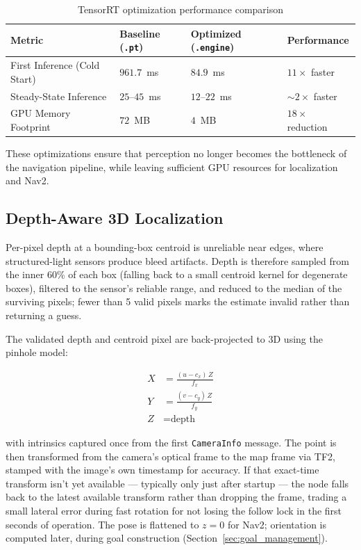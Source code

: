 \begin{table}[htbp]
\centering
\caption{TensorRT optimization performance comparison}
\label{tab:tensorrt_metrics}
\begin{tabular}{llll}
\toprule
\textbf{Metric} & \textbf{Baseline (\texttt{.pt})} & \textbf{Optimized (\texttt{.engine})} & \textbf{Performance} \\
\midrule
First Inference (Cold Start) & $961.7$~ms & $84.9$~ms & $11\times$ faster \\
Steady-State Inference      & $25$--$45$~ms & $12$--$22$~ms & $\sim 2\times$ faster \\
GPU Memory Footprint         & $72$~MB   & $4$~MB    & $18\times$ reduction \\
\bottomrule
\end{tabular}
\end{table}

These optimizations ensure that perception no longer becomes the bottleneck of the navigation pipeline, while leaving sufficient GPU resources for localization and Nav2.
 
\subsection{Depth-Aware 3D Localization}
\label{sec:localization}
 
Per-pixel depth at a bounding-box centroid is unreliable near edges, where structured-light sensors produce bleed artifacts. Depth is therefore sampled from the inner 60\% of each box (falling back to a small centroid kernel for degenerate boxes), filtered to the sensor's reliable range, and reduced to the median of the surviving pixels; fewer than 5 valid pixels marks the estimate invalid rather than returning a guess.
 
The validated depth and centroid pixel are back-projected to 3D using the pinhole model:
 
\begin{align}
X &= \frac{(u - c_x)\,Z}{f_x} \\
Y &= \frac{(v - c_y)\,Z}{f_y} \\
Z &= \text{depth}
\end{align}
 
with intrinsics captured once from the first \texttt{CameraInfo} message. The point is then transformed from the camera's optical frame to the map frame via TF2, stamped with the image's own timestamp for accuracy. If that exact-time transform isn't yet available --- typically only just after startup --- the node falls back to the latest available transform rather than dropping the frame, trading a small lateral error during fast rotation for not losing the follow lock in the first seconds of operation. The pose is flattened to $z=0$ for Nav2; orientation is computed later, during goal construction (Section~\ref{sec:goal_management}).
 
